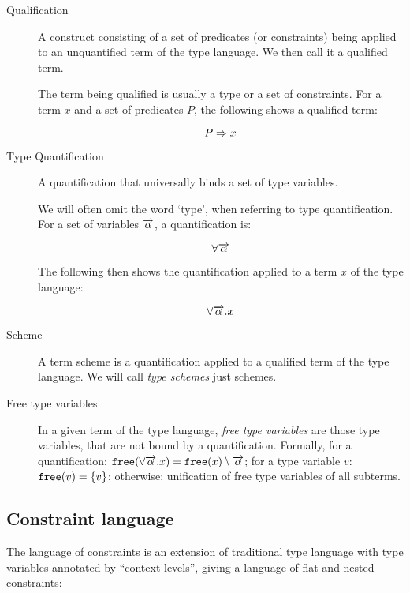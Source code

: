 \begin{description}
    \item[Qualification] A construct consisting of a set of predicates (or constraints) being applied to an unquantified term of the type language. We then call it a qualified term.

    The term being qualified is usually a type or a set of constraints. For a term $x$ and a set of predicates $P$, the following shows a qualified term:

    $$P \Rightarrow x$$

    \item[Type Quantification] A quantification that universally binds a set of type variables.

    We will often omit the word `type', when referring to type quantification. For a set of variables $\overrightarrow{\alpha}$, a quantification is:

    $$\forall \overrightarrow{\alpha}$$

    The following then shows the quantification applied to a term $x$ of the type language:

    $$\forall \overrightarrow{\alpha} . x$$

    \item[Scheme] A term scheme is a quantification applied to a qualified term of the type language. We will call \emph{type schemes} just schemes.

    \item[Free type variables] In a given term of the type language, \emph{free type variables} are those type variables, that are not bound by a quantification. Formally, for a quantification: $\mathtt{free} (\forall \overrightarrow{\alpha} . x) = \mathtt{free} (x) \setminus \overrightarrow{\alpha}$; for a type variable $v$: $\mathtt{free} (v) = \{v\}$; otherwise: unification of free type variables of all subterms.
\end{description}

\subsection{Constraint language}

The language of constraints is an extension of traditional type language with type variables annotated by ``context levels'', giving a language of flat and nested constraints:

